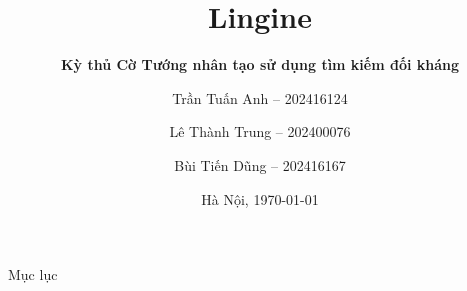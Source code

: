 \documentclass[aspectratio=169]{beamer}
\title{Lingine}
\subtitle{\textbf{Kỳ thủ Cờ Tướng nhân tạo sử dụng tìm kiếm đối kháng}}
\author[Anh, Trung \& Dũng]{Trần Tuấn Anh -- 202416124\texorpdfstring{\\}{, }
\and Lê Thành Trung -- 202400076\texorpdfstring{\\}{, }
\and Bùi Tiến Dũng -- 202416167}
\date{Hà Nội, \today}
\begin{document}
\begin{frame}
  \maketitle
\end{frame}

\begin{frame}{Mục lục}
  \tableofcontents
  \vspace{0.5cm}
\end{frame}

 
 
 
 
 
 
 
\end{document}
